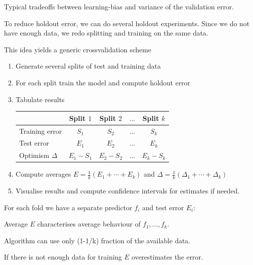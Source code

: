 \documentclass[landscape,footrule]{foils}
\begin{document}

\vspace*{-.5cm}
Typical tradeoffs between learning-bias and variance of the validation error.   


\enlargethispage{0.7cm}

To reduce holdout error, we can do several holdout experiments. 
Since we do not have enough data, we redo splitting and training on the same data. 

This idea yields a generic crossvalidation scheme
\begin{enumerate}
\item Generate several splits of test and training data
\item For each split train the model and compute holdout error
\item Tabulate results\vspace*{2ex}
\begin{center}
\begin{tabular}{|l|c|c|c|c|}
\hline
 & Split $1$ & Split $2$ & $\ldots$ & Split $k$\\
 \hline
 Training error & $S_1$ & $S_2$ & $\ldots$ & $S_k$\\
 Test error     & $E_1$ & $E_2$ & $\ldots$ & $E_k$\\
\hline
 Optimism $\Delta$    & $E_1-S_1$ & $E_2-S_2$ & $\ldots$ & $E_k-S_k$\\
 \cline{2-5}
\hline
\end{tabular}
\end{center}
\vspace*{2ex}
\item Compute averages $E=\frac{1}{k}(E_1+\cdots+E_k)$ and $\Delta=\frac{1}{k}(\Delta_1+\cdots+\Delta_k)$
\item Visualise results and compute confidence intervals for estimates if needed. 
\end{enumerate}



For each fold we have a separate predictor $f_i$ and test error $E_i$:
\begin{triangles}
\item Average $E$ characterises average behaviour of $f_1,\ldots, f_k$.
\item Algorithm can use only (1-1/k) fraction of the available data.
\item If there is not enough data for training $E$ overestimates the error. \vspace*{1cm}  
\end{triangles}
\end{document}
